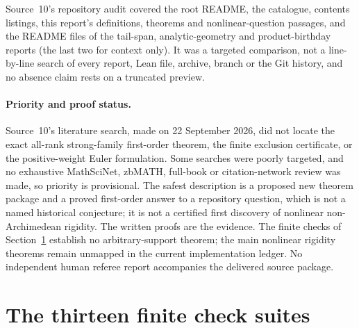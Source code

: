 \documentclass[11pt]{article}
\numberwithin{equation}{section}
\theoremstyle{definition}
\theoremstyle{remark}
\begin{document}
Source~10's repository audit covered the root README, the catalogue, contents
listings, this report's definitions, theorems and nonlinear-question passages,
and the README files of the tail-span, analytic-geometry and product-birthday
reports (the last two for context only). It was a targeted comparison, not a
line-by-line search of every report, Lean file, archive, branch or the Git
history, and no absence claim rests on a truncated preview.

\paragraph{Priority and proof status.}
Source~10's literature search, made on 22 September 2026, did not locate the
exact all-rank strong-family first-order theorem, the finite exclusion
certificate, or the positive-weight Euler formulation. Some searches were
poorly targeted, and no exhaustive MathSciNet, zbMATH, full-book or
citation-network review was made, so priority is provisional. The safest
description is a proposed new theorem package and a proved first-order answer
to a repository question, which is not a named historical conjecture; it is
not a certified first discovery of nonlinear non-Archimedean rigidity. The
written proofs are the evidence. The finite checks of
Section~\ref{hol:sec:verification} establish no arbitrary-support theorem;
the main nonlinear rigidity theorems remain unmapped in the current
implementation ledger. No independent human referee report accompanies the
delivered source package.

\section{The thirteen finite check suites}\label{hol:sec:verification}
\end{document}
